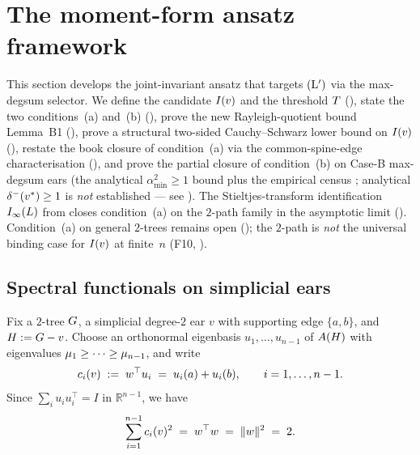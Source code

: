 \section{The moment-form ansatz framework}\label{sec:moment-form}

This section develops the joint-invariant ansatz that targets $(\mathrm{L}')$
via the max-degsum selector. We define the candidate $I(v)$ and the
threshold $T$ (), state the
two conditions~(a) and~(b) (), prove
the new Rayleigh-quotient bound Lemma~B1
(), prove a structural two-sided
Cauchy--Schwarz lower bound on $I(v)$
(), restate the book closure of
condition~(a) via the common-spine-edge characterisation
(), and prove the partial closure of
condition~(b) on Case-B max-degsum ears (the analytical
$\alpha_{\min}^{2} \ge 1$ bound  plus the
empirical census ; analytical
$\delta^{-}(v^{*}) \ge 1$ is \emph{not} established — see
). The Stieltjes-transform identification
$I_{\infty}(L)$ from  closes condition~(a)
on the $2$-path family in the asymptotic limit
(). Condition~(a) on general $2$-trees
remains open (); the $2$-path is \emph{not} the
universal binding case for $I(v)$ at finite~$n$ (F10,
).

\subsection{Spectral functionals on simplicial ears}\label{sec:moment-form:functionals}

Fix a $2$-tree $G$, a simplicial degree-$2$ ear $v$ with
supporting edge $\{a, b\}$, and $H := G - v$. Choose an
orthonormal eigenbasis $u_{1}, \ldots, u_{n-1}$ of $A(H)$
with eigenvalues $\mu_{1} \ge \cdots \ge \mu_{n-1}$, and write
\[
c_{i}(v) \;:=\; w^{\top} u_{i} \;=\; u_{i}(a) + u_{i}(b),
\qquad i = 1, \ldots, n-1.
\]
Since $\sum_{i} u_{i} u_{i}^{\top} = I$ in $\mathbb{R}^{n-1}$, we have
\[
\sum_{i = 1}^{n-1} c_{i}(v)^{2} \;=\; w^{\top} w \;=\; \|w\|^{2} \;=\; 2.
\]

